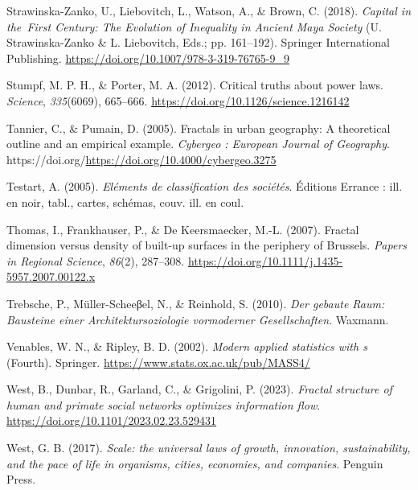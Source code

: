 \documentclass[
  12pt,
]{book}
\newlength{\cslhangindent}
\newlength{\cslentryspacingunit} %
\newenvironment{CSLReferences}[2] %
 {%
  \setlength{\parindent}{0pt}
  \ifodd #1
  \let\oldpar\par
  \def\par{\hangindent=\cslhangindent\oldpar}
  \fi
  \setlength{\parskip}{#2\cslentryspacingunit}
 }%
 {}
\begin{document}
\begin{CSLReferences}{1}{0}
\leavevmode{}%
Strawinska-Zanko, U., Liebovitch, L., Watson, A., \& Brown, C. (2018). \emph{Capital in the~First Century: The Evolution of Inequality in Ancient Maya Society} (U. Strawinska-Zanko \& L. Liebovitch, Eds.; pp. 161--192). Springer International Publishing. \url{https://doi.org/10.1007/978-3-319-76765-9_9}

\leavevmode{}%
Stumpf, M. P. H., \& Porter, M. A. (2012). Critical truths about power laws. \emph{Science}, \emph{335}(6069), 665--666. \url{https://doi.org/10.1126/science.1216142}

\leavevmode{}%
Tannier, C., \& Pumain, D. (2005). Fractals in urban geography: A theoretical outline and an empirical example. \emph{Cybergeo : European Journal of Geography}. https://doi.org/\url{https://doi.org/10.4000/cybergeo.3275}

\leavevmode{}%
Testart, A. (2005). \emph{Eléments de classification des sociétés}. Éditions Errance : ill. en noir, tabl., cartes, schémas, couv. ill. en coul.

\leavevmode{}%
Thomas, I., Frankhauser, P., \& De Keersmaecker, M.-L. (2007). Fractal dimension versus density of built-up surfaces in the periphery of Brussels. \emph{Papers in Regional Science}, \emph{86}(2), 287--308. \url{https://doi.org/10.1111/j.1435-5957.2007.00122.x}

\leavevmode{}%
Trebsche, P., Müller-Scheeβel, N., \& Reinhold, S. (2010). \emph{Der gebaute Raum: Bausteine einer Architektursoziologie vormoderner Gesellschaften}. Waxmann.

\leavevmode{}%
Venables, W. N., \& Ripley, B. D. (2002). \emph{Modern applied statistics with s} (Fourth). Springer. \url{https://www.stats.ox.ac.uk/pub/MASS4/}

\leavevmode{}%
West, B., Dunbar, R., Garland, C., \& Grigolini, P. (2023). \emph{Fractal structure of human and primate social networks optimizes information flow}. \url{https://doi.org/10.1101/2023.02.23.529431}

\leavevmode{}%
West, G. B. (2017). \emph{Scale: the universal laws of growth, innovation, sustainability, and the pace of life in organisms, cities, economies, and companies}. Penguin Press.


\end{CSLReferences}
\end{document}

